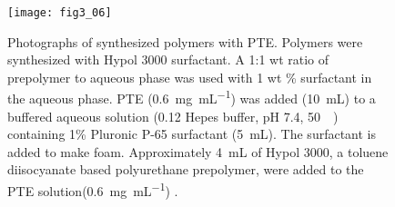 \begin{refsection}
\begin{figure}[htbp] \centering \texttt{[image: fig3\_06]}
    \caption[Photographs of synthesized polymers with PTE. Polymers were
        synthesized with Hypol 3000 surfactant. A 1:1 wt ratio of prepolymer to
        aqueous phase was used with 1 wt \% surfactant in the aqueous phase.
        PTE (\SI{0.6}{\mg\per\mL}) was added (\SI{10}{\mL}) to a buffered
        aqueous solution (\SI{0.12}{\Molar} Hepes buffer, pH 7.4,
        \SI{50}{\milli\Molar}) containing 1 \% Pluronic P-65
        surfactant (\SI{5}{\mL}). Approximately \SI{4}{\mL} of Hypol 3000, a
        toluene diisocyanate based polyurethane prepolymer, were added to the
        PTE solution(\SI{0.6}{\mg\per\mL}).]{Photographs of synthesized
            polymers with PTE. Polymers were synthesized with Hypol 3000 surfactant. A
            1:1 wt ratio of prepolymer to aqueous phase was used with 1 wt \%
            surfactant in the aqueous phase. PTE (\SI{0.6}{\mg\per\mL}) was
            added (\SI{10}{\mL}) to a buffered aqueous solution
            (\SI{0.12}{\Molar} Hepes buffer, pH 7.4,
            \SI{50}{\milli\Molar}) containing 1\% Pluronic P-65
            surfactant (\SI{5}{\mL}). The surfactant is added to make foam.
            Approximately \SI{4}{\mL} of Hypol 3000, a toluene diisocyanate
            based polyurethane prepolymer, were added to the PTE
            solution(\SI{0.6}{\mg\per\mL}) \cite{LeJeune1997a}.}
            \label{fig:pte-foam}
\end{figure}


\end{refsection}
